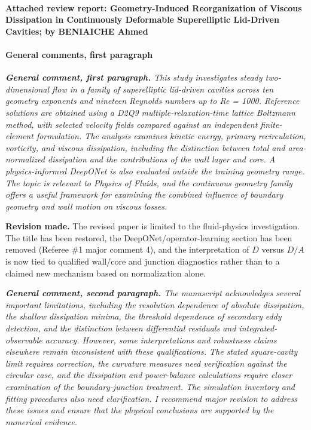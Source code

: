 \documentclass[11pt,a4paper]{article}
\newcommand{\qcomment}[1]{\textcolor{deepblue}{\itshape #1}}
\newcommand{\revwork}[1]{\textbf{\textcolor{revgreen}{#1}}}
\begin{document}
\medskip
\paragraph{Attached review report: Geometry-Induced Reorganization of Viscous Dissipation in Continuously Deformable Superelliptic Lid-Driven Cavities; by BENIAICHE Ahmed}

\medskip
\paragraph{General comments, first paragraph}

\medskip
\noindent\qcomment{\textbf{General comment, first paragraph.} This study investigates steady two-dimensional flow in a family of superelliptic lid-driven cavities across ten geometry exponents and nineteen Reynolds numbers up to Re = 1000. Reference solutions are obtained using a D2Q9 multiple-relaxation-time lattice Boltzmann method, with selected velocity fields compared against an independent finite-element formulation. The analysis examines kinetic energy, primary recirculation, vorticity, and viscous dissipation, including the distinction between total and area-normalized dissipation and the contributions of the wall layer and core. A physics-informed DeepONet is also evaluated outside the training geometry range. The topic is relevant to Physics of Fluids, and the continuous geometry family offers a useful framework for examining the combined influence of boundary geometry and wall motion on viscous losses.}

\noindent\revwork{Revision made.} The revised paper is limited to the fluid-physics investigation. The title has been restored, the DeepONet/operator-learning section has been removed (Referee \#1 major comment 4), and the interpretation of $D$ versus $D/A$ is now tied to qualified wall/core and junction diagnostics rather than to a claimed new mechanism based on normalization alone.

\medskip
\noindent\qcomment{\textbf{General comment, second paragraph.} The manuscript acknowledges several important limitations, including the resolution dependence of absolute dissipation, the shallow dissipation minima, the threshold dependence of secondary eddy detection, and the distinction between differential residuals and integrated-observable accuracy. However, some interpretations and robustness claims elsewhere remain inconsistent with these qualifications. The stated square-cavity limit requires correction, the curvature measures need verification against the circular case, and the dissipation and power-balance calculations require closer examination of the boundary-junction treatment. The simulation inventory and fitting procedures also need clarification. I recommend major revision to address these issues and ensure that the physical conclusions are supported by the numerical evidence.}
\end{document}
